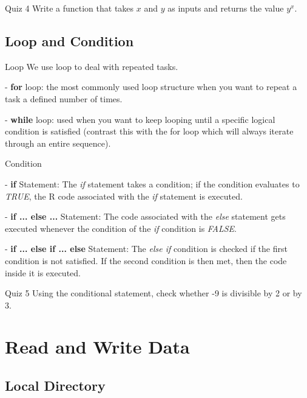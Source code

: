 \documentclass{beamer}
\begin{document}
\begin{frame}{Quiz 4}
    Write a function that takes $x$ and $y$ as inputs and returns the value $y^x$.
\end{frame}

\subsection{Loop and Condition}

\begin{frame}{Loop}
We use loop to deal with repeated tasks.\\
\hfill

- \textbf{for} loop: the most commonly used loop structure when you want to repeat a task a defined number of times.

- \textbf{while} loop: used when you want to keep looping until a specific logical condition is satisfied (contrast this with the for loop which will always iterate through an entire sequence).

\end{frame}

\begin{frame}{Condition}

- \textbf{if} Statement: The \textit{if} statement takes a condition; if the condition evaluates to \textit{TRUE}, the R code associated with the \textit{if} statement is executed.

- \textbf{if ... else ...} Statement: The code associated with the \textit{else} statement gets executed whenever the condition of the \textit{if} condition is \textit{FALSE}.

- \textbf{if ... else if ... else} Statement: The \textit{else if} condition is checked if the first condition is not satisfied. If the second condition is then met, then the code inside it is executed.

\end{frame}

\begin{frame}{Quiz 5}
Using the conditional statement, check whether -9 is divisible by 2 or by 3.
\end{frame}

\section{Read and Write Data}

\subsection{Local Directory}
\end{document}
